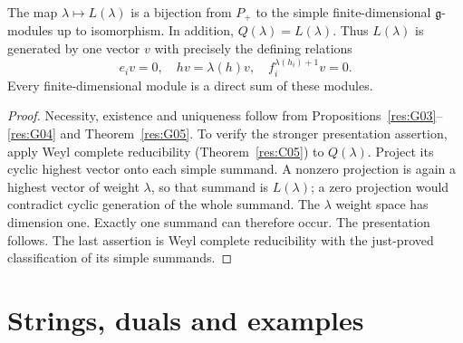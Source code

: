 \begin{theorem}
\label{res:G06}
The map \(\lambda\mapsto L(\lambda)\) is a bijection from \(P_+\)
to the simple finite-dimensional \(\mathfrak g\)-modules up to
isomorphism. In addition, \(Q(\lambda)=L(\lambda)\). Thus
\(L(\lambda)\) is generated by one vector \(v\) with precisely the
defining relations
\[
 e_iv=0,\quad hv=\lambda(h)v,\quad
 f_i^{\lambda(h_i)+1}v=0 .
\]
Every finite-dimensional module is a direct sum of these modules.
\end{theorem}
\begin{proof}
Necessity, existence and uniqueness follow from
Propositions~\ref{res:G03}--\ref{res:G04} and
Theorem~\ref{res:G05}. To verify the stronger presentation assertion,
apply Weyl complete reducibility (Theorem~\ref{res:C05}) to
\(Q(\lambda)\). Project its cyclic highest vector onto each simple
summand. A nonzero projection is again a highest vector of weight
\(\lambda\), so that summand is \(L(\lambda)\); a zero projection
would contradict cyclic generation of the whole summand.
The \(\lambda\) weight space has dimension one. Exactly one summand
can therefore occur. The presentation follows.
The last assertion is Weyl complete reducibility with the just-proved
classification of its simple summands.
\end{proof}

\section{Strings, duals and examples}

